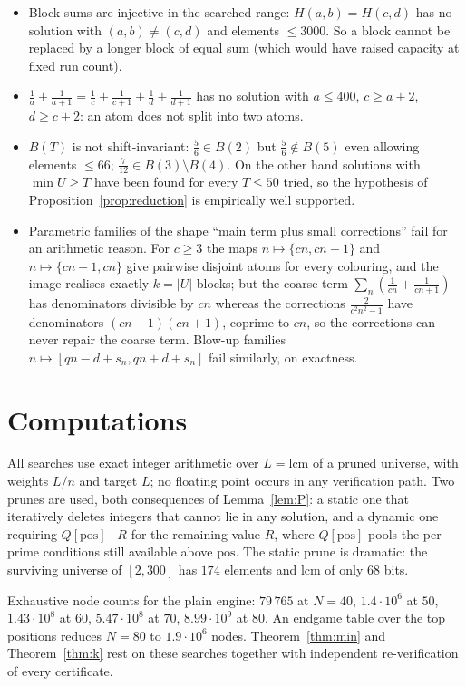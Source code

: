 \documentclass[11pt]{article}
\theoremstyle{definition}
\begin{document}
\begin{itemize}
\item Block sums are injective in the searched range: $H(a,b)=H(c,d)$ has no solution with
$(a,b)\ne(c,d)$ and elements $\le3000$. So a block cannot be replaced by a longer block of
equal sum (which would have raised capacity at fixed run count).
\item $\tfrac1a+\tfrac1{a+1}=\tfrac1c+\tfrac1{c+1}+\tfrac1d+\tfrac1{d+1}$ has no solution
with $a\le400$, $c\ge a+2$, $d\ge c+2$: an atom does not split into two atoms.
\item $B(T)$ is not shift-invariant: $\tfrac56\in B(2)$ but $\tfrac56\notin B(5)$ even
allowing elements $\le66$; $\tfrac7{12}\in B(3)\setminus B(4)$. On the other hand solutions
with $\min U\ge T$ have been found for every $T\le50$ tried, so the hypothesis of
Proposition~\ref{prop:reduction} is empirically well supported.
\item Parametric families of the shape ``main term plus small corrections'' fail for an
arithmetic reason. For $c\ge3$ the maps $n\mapsto\{cn,cn+1\}$ and $n\mapsto\{cn-1,cn\}$ give
pairwise disjoint atoms for every colouring, and the image realises exactly $k=|U|$ blocks;
but the coarse term $\sum_{n}(\tfrac1{cn}+\tfrac1{cn+1})$ has denominators divisible by $cn$
whereas the corrections $\tfrac{2}{c^2n^2-1}$ have denominators $(cn-1)(cn+1)$, coprime to
$cn$, so the corrections can never repair the coarse term. Blow-up families
$n\mapsto[qn-d+s_n,qn+d+s_n]$ fail similarly, on exactness.
\end{itemize}

\section{Computations}\label{sec:comp}

All searches use exact integer arithmetic over $L=\mathrm{lcm}$ of a pruned universe, with
weights $L/n$ and target $L$; no floating point occurs in any verification path. Two prunes
are used, both consequences of Lemma~\ref{lem:P}: a static one that iteratively deletes
integers that cannot lie in any solution, and a dynamic one requiring $Q[\mathrm{pos}]\mid R$
for the remaining value $R$, where $Q[\mathrm{pos}]$ pools the per-prime conditions still
available above $\mathrm{pos}$. The static prune is dramatic: the surviving universe of
$[2,300]$ has $174$ elements and lcm of only $68$ bits.

Exhaustive node counts for the plain engine: $79\,765$ at $N=40$, $1.4\cdot10^{6}$ at $50$,
$1.43\cdot10^{8}$ at $60$, $5.47\cdot10^{8}$ at $70$, $8.99\cdot10^{9}$ at $80$. An endgame
table over the top positions reduces $N=80$ to $1.9\cdot10^{6}$ nodes. Theorem~\ref{thm:min}
and Theorem~\ref{thm:k} rest on these searches together with independent re-verification of
every certificate.
\end{document}

